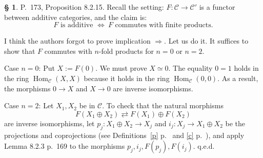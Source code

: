 \documentclass[12pt]{article}%
\theoremstyle{remark}
\theoremstyle{definition}
\newtheorem{s}[thm]{\S}%
\newcommand{\C}{\mathcal C}
\newcommand{\then}{\Rightarrow}
\newcommand{\ssi}{\Leftrightarrow}%
\DeclareMathOperator{\Hom}{Hom}%
\begin{document}
\begin{s} 
P.~173, Proposition 8.2.15. Recall the setting: $F:\C\to\C'$ is a functor between additive categories, and the claim is: 
$$
F\text{ is additive }\ssi\ F\text{ commutes with finite products}.
$$ 

I think the authors forgot to prove implication $\then$. Let us do it. It suffices to show that $F$ commutes with $n$-fold products for $n=0$ or $n=2$. 

Case $n=0$: Put $X:=F(0)$. We must prove $X\simeq 0$. The equality $0=1$ holds in the ring $\Hom_\C(X,X)$ because it holds in the ring $\Hom_\C(0,0)$. As a result, the morphisms $0\to X$ and $X\to 0$ are inverse isomorphisms. 

Case $n=2$: Let $X_1,X_2$ be in $\C$. To check that the natural morphisms 
%
\begin{equation}\label{173} 
F(X_1\oplus X_2)\rightleftarrows F(X_1)\oplus F(X_2)
\end{equation} 
%
are inverse isomorphisms, let $p_j:X_1\oplus X_2\to X_j$ and $i_j:X_j\to X_1\oplus X_2$ be the projections and coprojections (see Definitions~\ref{p} p.~\pageref{p} and \ref{c} p.~\pageref{c}), and apply Lemma 8.2.3 p.~169 to the morphisms $p_j,i_j,F(p_j),F(i_j)$. q.e.d.
\end{s}

%
\end{document}
